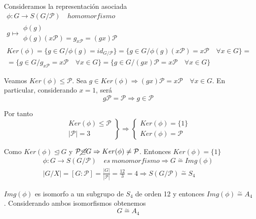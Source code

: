 \documentclass{article}
\begin{document}
Consideramos la representación asociada
\begin{gather*}
\phi:G\longrightarrow S(G/\mathcal{P})\quad homomorfismo\\
g\longmapsto \left.\begin{array}{c}
\phi(g)\\
\phi(g)(x\mathcal{P})=g_{x\mathcal{P}}=(gx)\mathcal{P}
\end{array} \right. \\
Ker(\phi)=\{g\in G/\phi(g)=id_{G/\mathcal{P}}\}=\{g\in G/\phi(g)(x\mathcal{P})=x\mathcal{P}\quad \forall x\in G\}= \\
=\{g\in G/g_{x\mathcal{P}}=x\mathcal{P}\quad \forall x\in G\}=\{g\in G/(gx)\mathcal{P}=x\mathcal{P}\quad \forall x\in G\}
\end{gather*}

Veamos $Ker(\phi)\leq \mathcal{P}$. Sea $g\in Ker(\phi)\Rightarrow (gx)\mathcal{P}=x\mathcal{P} \quad \forall x\in G$. En particular, considerando $x=1$, será 
\begin{equation*}
g\mathcal{P}=\mathcal{P}\Rightarrow g\in \mathcal{P}
\end{equation*}

Por tanto
\begin{equation*}
\left.\begin{array}{c}
Ker(\phi)\leq \mathcal{P} \\
|\mathcal{P}|=3
\end{array} \right\rbrace\Rightarrow \left\lbrace \begin{array}{c}
Ker(\phi)=\{1\} \\
Ker(\phi)=\mathcal{P}
\end{array}\right.
\end{equation*}

Como $Ker(\phi)\unlhd G$ y $\mathcal{P}\cancel{\unlhd} G\Rightarrow Ker(\phi)\neq \mathcal{P}$. Entonces $Ker(\phi)=\{1\}$
\begin{gather*}
\phi:G\longrightarrow S(G/\mathcal{P}) \quad es\:monomorfismo\Rightarrow G\overset{\sim}{=} Img(\phi) \\
|G/X|=\left[G:\mathcal{P}\right]=\frac{|G|}{|\mathcal{P}|}=\frac{12}{3}=4 \Rightarrow S(G/\mathcal{P})\overset{\sim}{=} S_4
\end{gather*}

$Img(\phi)$ es isomorfo a un subgrupo de $S_4$ de orden 12 y entonces $Img(\phi)\overset{\sim}{=} A_4$. Considerando ambos isomorfismos obtenemos
\begin{equation*}
G\overset{\sim}{=} A_4
\end{equation*}
\end{document}
